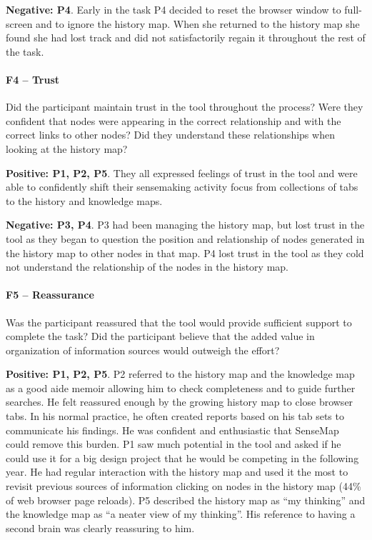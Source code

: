 \textbf{Negative: P4}. Early in the task P4 decided to reset the browser window to full-screen and to ignore the history map. When she returned to the history map she found she had lost track and did not satisfactorily regain it throughout the rest of the task.

\paragraph{F4 -- Trust}
Did the participant maintain trust in the tool throughout the process? Were they confident that nodes were appearing in the correct relationship and with the correct links to other nodes? Did they understand these relationships when looking at the history map?

\textbf{Positive: P1, P2, P5}. They all expressed feelings of trust in the tool and were able to confidently shift their sensemaking activity focus from collections of tabs to the history and knowledge maps.

\textbf{Negative: P3, P4}. P3 had been managing the history map, but lost trust in the tool as they began to question the position and relationship of nodes generated in the history map to other nodes in that map. P4 lost trust in the tool as they cold not understand the relationship of the nodes in the history map.

\paragraph{F5 -- Reassurance}
Was the participant reassured that the tool would provide sufficient support to complete the task? Did the participant believe that the added value in organization of information sources would outweigh the effort?

\textbf{Positive: P1, P2, P5}. P2 referred to the history map and the knowledge map as a good aide memoir allowing him to check completeness and to guide further searches. He felt reassured enough by the growing history map to close browser tabs. In his normal practice, he often created reports based on his tab sets to communicate his findings. He was confident and enthusiastic that SenseMap could remove this burden. P1 saw much potential in the tool and asked if he could use it for a big design project that he would be competing in the following year. He had regular interaction with the history map and used it the most to revisit previous sources of information clicking on nodes in the history map (44\% of web browser page reloads). P5 described the history map as ``my thinking'' and the knowledge map as ``a neater view of my thinking''. His reference to having a second brain was clearly reassuring to him.

